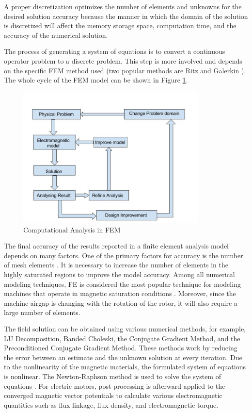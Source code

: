 A proper discretization optimizes the number of elements and unknowns for the desired solution accuracy because the manner in which the domain of the solution is discretized will affect the memory storage space, computation time, and the accuracy of the numerical solution. 

The process of generating a system of equations is to convert a continuous operator problem to a discrete problem. This step is more involved and depends on the specific FEM method used (two popular methods are Ritz and Galerkin \parencite{silvester1996finite}). The whole cycle of the FEM model can be shown in Figure \ref{fig:FEM}.

\begin{figure}[h!]
\centering
\includegraphics[width=0.85\textwidth]{Figures/Chp2_CNN/Proposal.pdf}
\caption{Computational Analysis in FEM}
\label{fig:FEM}
\end{figure}

The final accuracy of the results reported in a finite element analysis model depends on many factors. One of the primary factors for accuracy is the number of mesh elements \parencite{bianchi1998design}. It is necessary to increase the number of elements in the highly saturated regions to improve the model accuracy. Among all numerical modeling techniques, FE is considered the most popular technique for modeling machines that operate in magnetic saturation conditions \parencite{bostanci2017opportunities}. Moreover, since the machine airgap is changing with the rotation of the rotor, it will also require a large number of elements.

The field solution can be obtained using various numerical methods, for example, LU Decomposition, Banded Choleski, the Conjugate Gradient Method, and the Preconditioned Conjugate Gradient Method. These methods work by reducing the error between an estimate and the unknown solution at every iteration.
Due to the nonlinearity of the magnetic materials, the formulated system of equations is nonlinear. The Newton-Raphson method is used to solve the system of equations \parencite{salon1995finite}. For electric motors, post-processing is afterward applied to the converged magnetic vector potentials to calculate various electromagnetic quantities such as flux linkage, flux density, and electromagnetic torque.

